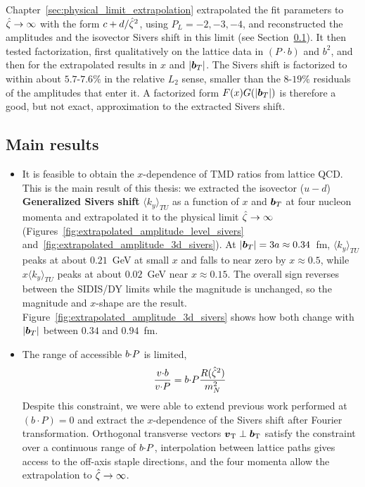 Chapter~\ref{sec:physical_limit_extrapolation} extrapolated the fit parameters to ${\hat \zeta}\to\infty$ with the form $c+d/{\hat \zeta}^2$, using $P_L=-2,-3,-4$, and reconstructed the amplitudes and the isovector Sivers shift in this limit (see Section~\ref{sec:conclusion_results}). It then tested factorization, first qualitatively on the lattice data in $(P\cdot b)$ and $b^2$, and then for the extrapolated results in $x$ and $|\boldsymbol{b}_T|$. The Sivers shift is factorized to within about $5.7$-$7.6\%$ in the relative $L_2$ sense, smaller than the $8$-$19\%$ residuals of the amplitudes that enter it. A factorized form $F(x)G(|\boldsymbol{b}_T|)$ is therefore a good, but not exact, approximation to the extracted Sivers shift.

\subsection{Main results}
\label{sec:conclusion_results}

\begin{itemize}
	\item It is feasible to obtain the $x$-dependence of TMD ratios from lattice QCD. This is the main result of this thesis: we extracted the isovector ($u-d$) \textbf{Generalized Sivers shift} $\langle k_y\rangle_{TU}$ as a function of $x$ and $\boldsymbol{b}_T$ at four nucleon momenta and extrapolated it to the physical limit ${\hat \zeta}\to\infty$ (Figures~\ref{fig:extrapolated_amplitude_level_sivers} and~\ref{fig:extrapolated_amplitude_3d_sivers}). At $|\boldsymbol{b}_T| = 3a \approx 0.34$~fm, $\langle k_y\rangle_{TU}$ peaks at about $0.21$~GeV at small $x$ and falls to near zero by $x \approx 0.5$, while $x\langle k_y\rangle_{TU}$ peaks at about $0.02$~GeV near $x \approx 0.15$. The overall sign reverses between the SIDIS/DY limits while the magnitude is unchanged, so the magnitude and $x$-shape are the result. Figure~\ref{fig:extrapolated_amplitude_3d_sivers} shows how both change with $|\boldsymbol{b}_T|$ between $0.34$ and $0.94$~fm.
	\item The range of accessible $b {\cdot} P$ is limited,
	\begin{align}
		\frac{v {\cdot} b}{v {\cdot} P} = b {\cdot} P \frac{R({\hat \zeta}^2)}{m_N^2}\, 
	\end{align}
	Despite this constraint, we were able to extend previous work performed at $(b\cdot P)=0$ and extract the $x$-dependence of the Sivers shift after Fourier transformation. Orthogonal transverse vectors $\boldsymbol{v}_{\mathrm T}\perp\boldsymbol{b}_{\mathrm T}$ satisfy the constraint over a continuous range of $b{\cdot} P$, interpolation between lattice paths gives access to the off-axis staple directions, and the four momenta allow the extrapolation to ${\hat \zeta}\to\infty$.
\end{itemize}

